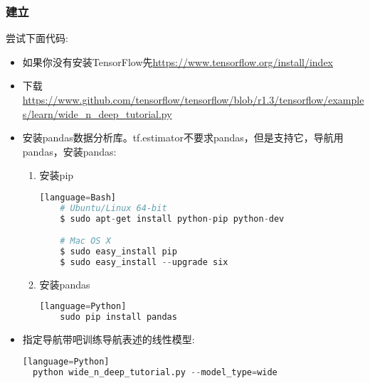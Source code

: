 \subsubsection{建立}
尝试下面代码:
\begin{itemize}
  \item 如果你没有安装TensorFlow先\href{安装}{https://www.tensorflow.org/install/index}
  \item 下载\href{导航代码}{https://www.github.com/tensorflow/tensorflow/blob/r1.3/tensorflow/examples/learn/wide\_n\_deep\_tutorial.py}
  \item 安装pandas数据分析库。tf.estimator不要求pandas，但是支持它，导航用pandas，安装pandas:
  \begin{enumerate}
    \item  安装pip
    \begin{lstlisting}[language=Python][language=Bash]
    # Ubuntu/Linux 64-bit
    $ sudo apt-get install python-pip python-dev

    # Mac OS X
    $ sudo easy_install pip
    $ sudo easy_install --upgrade six
    \end{lstlisting}
    \item 安装pandas
    \begin{lstlisting}[language=Python][language=Python]
    sudo pip install pandas
    \end{lstlisting}
  \end{enumerate}
  \item 指定导航带吧训练导航表述的线性模型:
  \begin{lstlisting}[language=Python][language=Python]
  python wide_n_deep_tutorial.py --model_type=wide
  \end{lstlisting}
\end{itemize}
